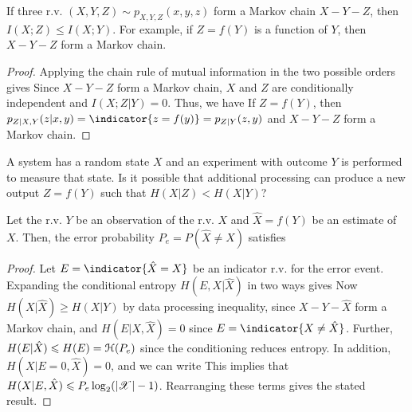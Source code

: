 \documentclass[letterpaper,10pt,english]{article}
\begin{document}
\begin{thm} 
If three r.v. $(X, Y, Z) \sim p_{X,Y,Z} (x, y, z)$ form a Markov chain $X - Y- Z$, then 
$I(X;Z) \le I(X;Y)$. 
For example, if $Z=f(Y)$ is a function of $Y$, 
then $X -Y - Z$ form a Markov chain. 
\end{thm} 
\begin{proof}
Applying the chain rule of mutual information in the two possible orders gives 
Since $X - Y - Z$ form a Markov chain, $X$ and $Z$ are conditionally independent and 
$I(X;Z|Y) = 0$. 
Thus, we have 
If $Z = f(Y)$, then $p_{Z|X,Y}(z|x,y) = \indicator{z =f(y)} = p_{Z|Y}(z,y)$ and $X - Y - Z$ form a Markov chain.
\end{proof} 
\begin{shaded*}\begin{exmp}
A system has a random state $X$ and an experiment with outcome $Y$ is performed to measure that state. 
Is it possible that additional processing can produce a new output $Z = f(Y)$ such that 
$H (X|Z) < H (X|Y )$?
\end{exmp}\end{shaded*}
\begin{thm}  
Let the r.v. $Y$ be an observation of the r.v. $X$ and $\hat{X} = f(Y)$ be an estimate of $X$. 
Then, the error probability $P_e = P(\hat{X} \neq X)$ satisfies 
\end{thm} 
\begin{proof}
Let $E = \indicator{\hat{X}= X}$ be an indicator r.v. for the error event. 
Expanding the conditional entropy $H(E, X |\hat{X})$ in two ways gives 
Now $H(X|\hat{X}) \ge H(X|Y)$ by data processing inequality, since $X - Y - \hat{X}$ form a Markov chain, 
and $H(E| X, \hat{X}) = 0$ since $E = \indicator{X \neq \hat{X}}$. 
Further, $H(E|\hat{X}) \leqslant H(E) = \mathcal{H}(P_e)$ since the conditioning reduces entropy. 
In addition, $H(X|E=0, \hat{X}) = 0$, and we can write 
This implies that $H(X|E, \hat{X}) \leqslant P_e\log_2(\left\lvert\mathscr{X}\right\rvert-1)$. 
Rearranging these terms gives the stated result.
\end{proof}
\end{document}
